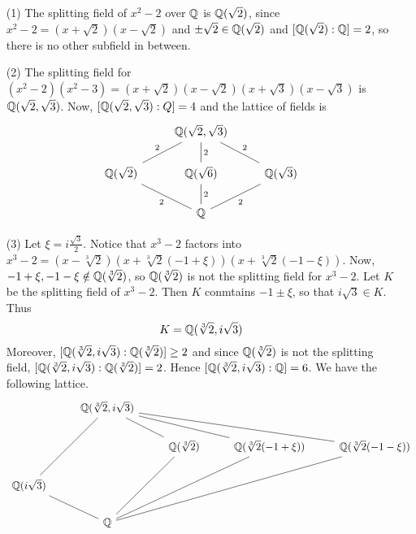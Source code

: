 \begin{example}\label{example_8.11}
  \begin{enumerate}
    \item[(1)] The splitting field of $x^2-2$ over  $\mathbb{Q}$ is  $\mathbb{Q}(\sqrt{2})$,
      since $x^2-2=(x+\sqrt{2})(x-\sqrt{2})$ and $\pm{\sqrt{2}} \in
      \mathbb{Q}(\sqrt{2})$ and $[\mathbb{Q}(\sqrt{2}):\mathbb{Q}]=2$, so there is no other
      subfield in between.

    \item[(2)] The splitting field for
      $(x^2-2)(x^2-3)=(x+\sqrt{2})(x-\sqrt{2})(x+\sqrt{3})(x-\sqrt{3})$ is
      $\mathbb{Q}(\sqrt{2},\sqrt{3})$. Now, $[\mathbb{Q}(\sqrt{2},\sqrt{3}):Q]=4$ and the
      lattice of fields is
      \[\begin{tikzcd}
                & {\Q(\sqrt{2},\sqrt{3})} \\
        {\Q(\sqrt{2})} & {\Q(\sqrt{6})} & {\Q(\sqrt{3})} \\
                       & {\mathbb{Q}}
                       \arrow["2", no head, from=1-2, to=2-2]
                       \arrow["2", no head, from=2-2, to=3-2]
                       \arrow["2"', no head, from=3-2, to=2-3]
                       \arrow["2"', no head, from=2-3, to=1-2]
                       \arrow["2"', no head, from=1-2, to=2-1]
                       \arrow["2"', no head, from=2-1, to=3-2]
      \end{tikzcd}\]

    \item[(3)] Let $\xi=i\frac{\sqrt{3}}{2}$. Notice that $x^3-2$ factors
      into
      $x^3-2=(x-\sqrt[3]{2})(x+\sqrt[3]{2}(-1+\xi))(x+\sqrt[3]{2}(-1-\xi))$.
      Now, $-1+\xi,-1-\xi \notin \mathbb{Q}(\sqrt[3]{2})$, so $\mathbb{Q}(\sqrt[3]{2})$
      is not the splitting field for $x^3-2$. Let  $K$ be the splitting
      field of  $x^3-2$. Then  $K$ conmtains $-1 \pm \xi$, so that
      $i\sqrt{3} \in K$. Thus
      \begin{equation*}
        K=\mathbb{Q}(\sqrt[3]{2},i\sqrt{3})
      \end{equation*}
      Moreover, $[\mathbb{Q}(\sqrt[3]{2},i\sqrt{3}):\mathbb{Q}(\sqrt[3]{2})] \geq 2$
      and since $\mathbb{Q}(\sqrt[3]{2})$ is not the splitting field,
      $[\mathbb{Q}(\sqrt[3]{2},i\sqrt{3}):\mathbb{Q}(\sqrt[3]{2})]=2$. Hence
      $[\mathbb{Q}(\sqrt[3]{2},i\sqrt{3}):\mathbb{Q}]=6$. We have the following lattice.
      \[\begin{tikzcd}
                & {\Q(\sqrt[3]{2},i\sqrt{3})} \\
                && {\Q(\sqrt[3]{2})} & {\Q(\sqrt[3]{2}(-1+\xi))} & {\Q(\sqrt[3]{2}
                (-1-\xi))} \\
                {\mathbb{Q}(i\sqrt{3})} \\
                & {\mathbb{Q}}
                \arrow[no head, from=1-2, to=3-1]
                \arrow[no head, from=3-1, to=4-2]
                \arrow[no head, from=4-2, to=2-4]
                \arrow[no head, from=2-4, to=1-2]
                \arrow[no head, from=1-2, to=2-3]
                \arrow[no head, from=2-3, to=4-2]
                \arrow[no head, from=1-2, to=2-5]
                \arrow[no head, from=2-5, to=4-2]
      \end{tikzcd}\]


\end{enumerate}
\end{example}
